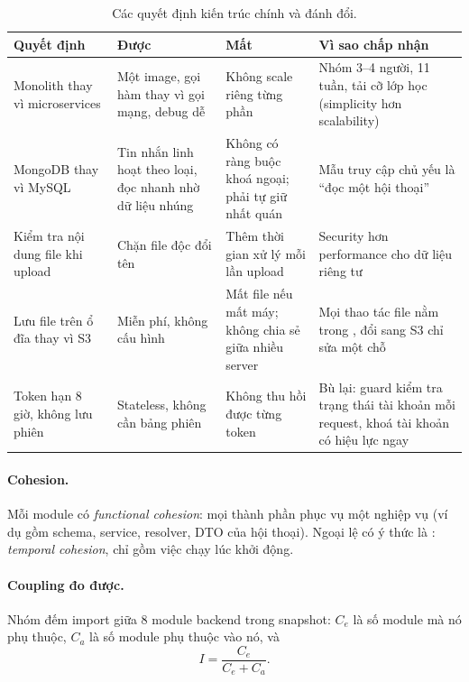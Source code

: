 \documentclass[11pt, a4paper]{article}
\begin{document}
\begin{table}[H]
  \centering
  \small
  \caption{Các quyết định kiến trúc chính và đánh đổi.}
  \label{tab:tradeoffs}
  \begin{tabularx}{\linewidth}{P{2.8cm}YYY}
    \toprule
    \textbf{Quyết định} & \textbf{Được} & \textbf{Mất} & \textbf{Vì sao chấp nhận} \\
    \midrule
    Monolith thay vì microservices & Một image, gọi hàm thay vì gọi mạng, debug dễ & Không scale riêng từng phần & Nhóm 3--4 người, 11 tuần, tải cỡ lớp học (simplicity hơn scalability) \\
    MongoDB thay vì MySQL & Tin nhắn linh hoạt theo loại, đọc nhanh nhờ dữ liệu nhúng & Không có ràng buộc khoá ngoại; phải tự giữ nhất quán & Mẫu truy cập chủ yếu là ``đọc một hội thoại'' \\
    Kiểm tra nội dung file khi upload & Chặn file độc đổi tên & Thêm thời gian xử lý mỗi lần upload & Security hơn performance cho dữ liệu riêng tư \\
    Lưu file trên ổ đĩa thay vì S3 & Miễn phí, không cấu hình & Mất file nếu mất máy; không chia sẻ giữa nhiều server & Mọi thao tác file nằm trong , đổi sang S3 chỉ sửa một chỗ \\
    Token hạn 8 giờ, không lưu phiên & Stateless, không cần bảng phiên & Không thu hồi được từng token & Bù lại: guard kiểm tra trạng thái tài khoản mỗi request, khoá tài khoản có hiệu lực ngay \\
    \bottomrule
  \end{tabularx}
\end{table}

\paragraph{Cohesion.} Mỗi module có \emph{functional cohesion}: mọi thành phần phục vụ một nghiệp vụ (ví dụ  gồm schema, service, resolver, DTO của hội thoại). Ngoại lệ có ý thức là : \emph{temporal cohesion}, chỉ gồm việc chạy lúc khởi động.

\paragraph{Coupling đo được.} Nhóm đếm import giữa 8 module backend trong snapshot: $C_e$ là số module mà nó phụ thuộc, $C_a$ là số module phụ thuộc vào nó, và
\begin{equation}
  I = \frac{C_e}{C_e + C_a}.
\end{equation}
\end{document}
